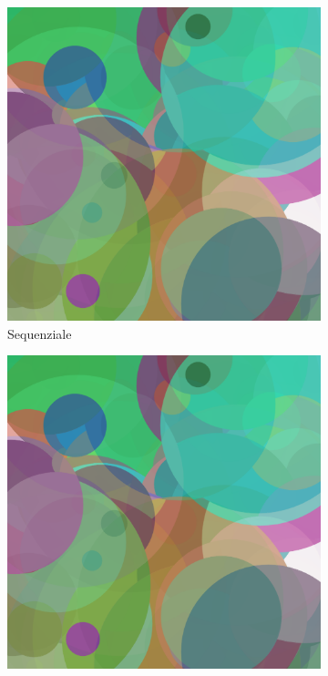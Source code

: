 \documentclass[11pt]{article}
\begin{document}
    \begin{figure}[h!]
        \begin{subfigure}{0.32\textwidth}
            \centering
            \includegraphics[width=\textwidth]{../results/img/seq/3000}
            \caption{Sequenziale}
        \end{subfigure}%
        \hfill
        \begin{subfigure}{0.32\textwidth}
            \centering
            \includegraphics[width=\textwidth]{../results/img/par/3000}

\end{subfigure}
\end{figure}
\end{document}
